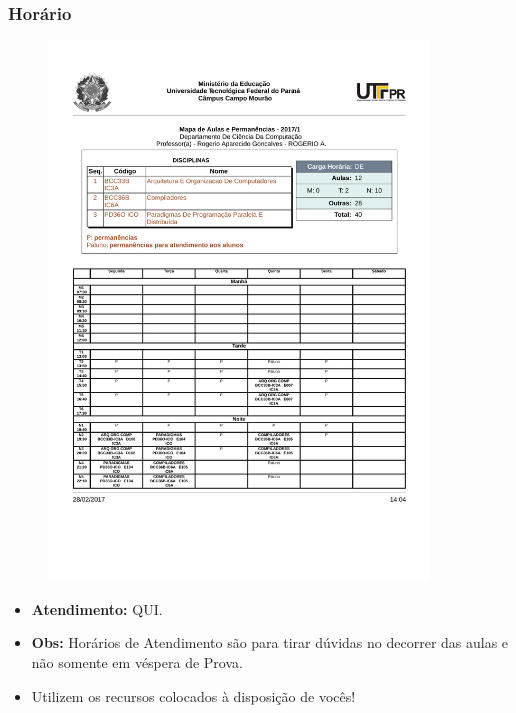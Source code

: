 \documentclass{beamer}
\begin{document}
\begin{frame}
	\frametitle{Horário}
	\fontsize{14pt}{7.2}\selectfont
	\begin{minipage}[t][\textheight][t]{\textwidth}
		\begin{figure}
			\centering
			\includegraphics[trim=1.0cm 5.0cm 1.0cm 16.3cm, clip, width=0.9\textwidth]{figures/horario-rag-2017-01}
		\end{figure}
		\begin{itemize}
			\item \textbf{Atendimento:} QUI.
			\item \textbf{Obs:} Horários de Atendimento são para tirar dúvidas no decorrer das aulas e não somente em véspera de Prova.
			\item Utilizem os recursos colocados à disposição de vocês!
		\end{itemize}
	\end{minipage}
\end{frame}
\end{document}
